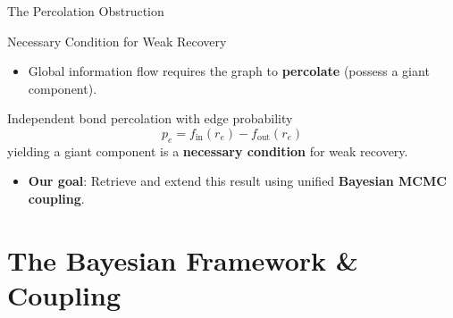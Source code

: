 \documentclass[A4,svgnames,9pt,aspectratio=169]{beamer}
\begin{document}
\begin{frame}{The Percolation Obstruction}
  \begin{block}{Necessary Condition for Weak Recovery \cite{SankararamanBaccelli2018}}
    \begin{itemize}
      \item Global information flow requires the graph to \textbf{percolate} \cite{penrose2003} (possess a giant component).
    \end{itemize}
  \end{block}
  \begin{theorem}
    Independent bond percolation with edge probability
    \begin{equation*}
        p_e = f_{\mathrm{in}}(r_e) - f_{\mathrm{out}}(r_e)
    \end{equation*}
    yielding a giant component is a \textbf{necessary condition} for weak recovery.
  \end{theorem}
  \begin{itemize}
    \item \textbf{Our goal}: Retrieve and extend this result using unified \textbf{Bayesian MCMC coupling}.
  \end{itemize}
\end{frame}


\section{The Bayesian Framework \& Coupling}
\frame{\sectionpage}
\end{document}
